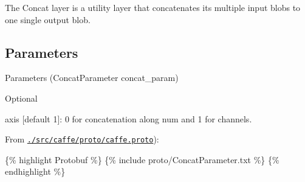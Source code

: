 The {\ttfamily Concat} layer is a utility layer that concatenates its multiple input blobs to one single output blob.

\subsection*{Parameters}


\begin{DoxyItemize}
\item Parameters ({\ttfamily Concat\+Parameter concat\+\_\+param})
\begin{DoxyItemize}
\item Optional
\begin{DoxyItemize}
\item {\ttfamily axis} \mbox{[}default 1\mbox{]}\+: 0 for concatenation along num and 1 for channels.
\end{DoxyItemize}
\end{DoxyItemize}
\item From \href{https://github.com/BVLC/caffe/blob/master/src/caffe/proto/caffe.proto}{\tt {\ttfamily ./src/caffe/proto/caffe.proto}})\+:
\end{DoxyItemize}

\{\% highlight Protobuf \%\} \{\% include proto/\+Concat\+Parameter.\+txt \%\} \{\% endhighlight \%\} 